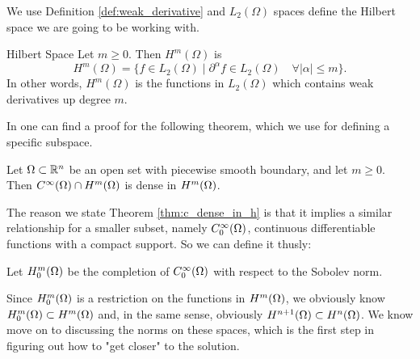 We use Definition \ref*{def:weak_derivative} and $L_2(\Omega)$ spaces 
define the Hilbert space we are going to be working with. 
\begin{defn}{Hilbert Space}
   Let $m \geq 0$. Then $H^m(\Omega)$ is 
   \begin{equation*}
    H^m(\Omega) = \{  f \in L_2(\Omega) \mid \partial ^{\alpha}f \in 
    L_2(\Omega) \quad \forall |\alpha| \leq m  \}.
   \end{equation*}
   In other words, $H^m(\Omega)$ is the functions in $L_2(\Omega)$ 
   which contains weak derivatives up degree $m$.
\end{defn}
In \cite{Brezis} one can find a proof for the following theorem, which 
we use for defining a specific subspace.
\begin{thmx}{\quad}
   Let $\Omega \subset \mathbb{R}^n$ be an open set with piecewise smooth boundary, 
   and let $m \geq 0$. Then $C^\infty (\Omega) \cap H^m(\Omega)$ is dense in 
   $H^m(\Omega)$.
   \label{thm:c_dense_in_h}
\end{thmx}
The reason we state Theorem \ref{thm:c_dense_in_h} is that it implies a 
similar relationship for a smaller subset, namely $C^\infty_0(\Omega)$, 
continuous differentiable functions with a compact support. So we can 
define it thusly:
\begin{defn}{\quad}
  Let $H_0^m(\Omega)$ be the completion of $C^\infty_0(\Omega)$ with respect 
  to the Sobolev norm.
\end{defn} 
Since $H_0^m(\Omega)$ is a restriction on the functions in $H^m(\Omega)$, 
we obviously know $H_0^m(\Omega) \subset H^m(\Omega)$ and, in the same 
sense, obviously $H^{n+1}(\Omega) \subset H^n(\Omega)$.
We know move on to discussing the norms on these spaces, 
which is the first step in figuring out how to "get closer" to 
the solution.
